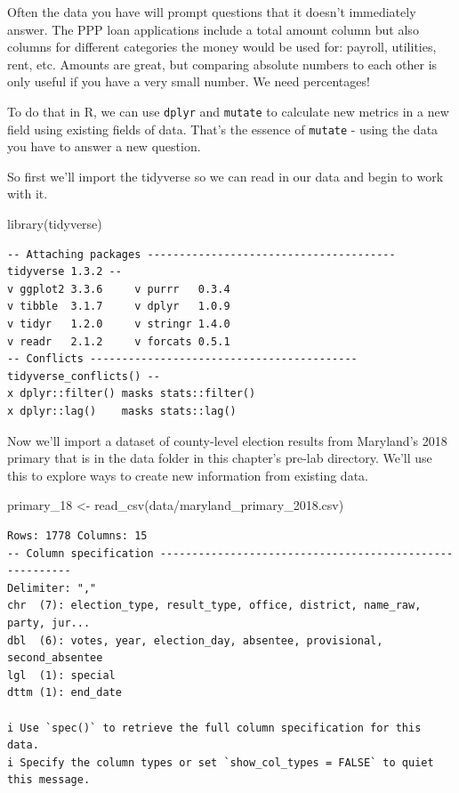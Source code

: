 \documentclass[
  letterpaper,
  DIV=11,
  numbers=noendperiod]{scrreprt}
\newenvironment{Shaded}{\begin{snugshade}}{\end{snugshade}}
\newcommand{\FunctionTok}[1]{\textcolor[rgb]{0.28,0.35,0.67}{#1}}
\newcommand{\NormalTok}[1]{\textcolor[rgb]{0.00,0.23,0.31}{#1}}
\newcommand{\OtherTok}[1]{\textcolor[rgb]{0.00,0.23,0.31}{#1}}
\newcommand{\StringTok}[1]{\textcolor[rgb]{0.13,0.47,0.30}{#1}}
\begin{document}
Often the data you have will prompt questions that it doesn't
immediately answer. The PPP loan applications include a total amount
column but also columns for different categories the money would be used
for: payroll, utilities, rent, etc. Amounts are great, but comparing
absolute numbers to each other is only useful if you have a very small
number. We need percentages!

To do that in R, we can use \texttt{dplyr} and \texttt{mutate} to
calculate new metrics in a new field using existing fields of data.
That's the essence of \texttt{mutate} - using the data you have to
answer a new question.

So first we'll import the tidyverse so we can read in our data and begin
to work with it.

\begin{Shaded}
\begin{Highlighting}[]
\FunctionTok{library}\NormalTok{(tidyverse)}
\end{Highlighting}
\end{Shaded}

\begin{verbatim}
-- Attaching packages --------------------------------------- tidyverse 1.3.2 --
v ggplot2 3.3.6     v purrr   0.3.4
v tibble  3.1.7     v dplyr   1.0.9
v tidyr   1.2.0     v stringr 1.4.0
v readr   2.1.2     v forcats 0.5.1
-- Conflicts ------------------------------------------ tidyverse_conflicts() --
x dplyr::filter() masks stats::filter()
x dplyr::lag()    masks stats::lag()
\end{verbatim}

Now we'll import a dataset of county-level election results from
Maryland's 2018 primary that is in the data folder in this chapter's
pre-lab directory. We'll use this to explore ways to create new
information from existing data.

\begin{Shaded}
\begin{Highlighting}[]
\NormalTok{primary\_18 }\OtherTok{\textless{}{-}} \FunctionTok{read\_csv}\NormalTok{(}\StringTok{\textquotesingle{}data/maryland\_primary\_2018.csv\textquotesingle{}}\NormalTok{)}
\end{Highlighting}
\end{Shaded}

\begin{verbatim}
Rows: 1778 Columns: 15
-- Column specification --------------------------------------------------------
Delimiter: ","
chr  (7): election_type, result_type, office, district, name_raw, party, jur...
dbl  (6): votes, year, election_day, absentee, provisional, second_absentee
lgl  (1): special
dttm (1): end_date

i Use `spec()` to retrieve the full column specification for this data.
i Specify the column types or set `show_col_types = FALSE` to quiet this message.
\end{verbatim}
\end{document}
